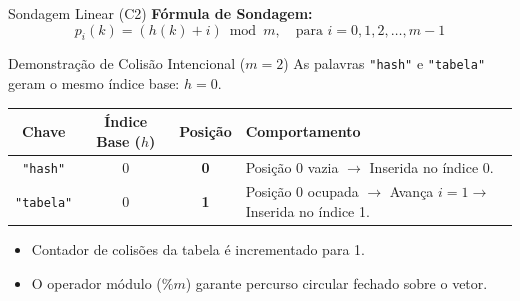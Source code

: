 \documentclass[aspectratio=169,11pt]{beamer}
\begin{document}
\begin{frame}{Sondagem Linear (C2)}
  \textbf{Fórmula de Sondagem:}
  $$p_i(k) = (h(k) + i) \bmod m, \quad \text{para } i = 0, 1, 2, \dots, m-1$$

  \begin{block}{Demonstração de Colisão Intencional ($m = 2$)}
    As palavras \texttt{"hash"} e \texttt{"tabela"} geram o mesmo índice base: $h = 0$.
  \end{block}

  \footnotesize
  \renewcommand{\arraystretch}{1.15}
  \centering
  \begin{tabular}{@{}cccl@{}}
    \toprule
    \textbf{Chave} & \textbf{Índice Base ($h$)} & \textbf{Posição} & \textbf{Comportamento} \\
    \midrule
    \texttt{"hash"}   & 0 & \textbf{0} & Posição 0 vazia $\rightarrow$ Inserida no índice 0. \\
    \texttt{"tabela"} & 0 & \textbf{1} & Posição 0 ocupada $\rightarrow$ Avança $i=1 \rightarrow$ Inserida no índice 1. \\
    \bottomrule
  \end{tabular}

  \vspace{0.8em}
  \normalsize
  \begin{itemize}
    \item Contador de colisões da tabela é incrementado para 1.
    \item O operador módulo ($\% m$) garante percurso circular fechado sobre o vetor.
  \end{itemize}
\end{frame}
\end{document}
